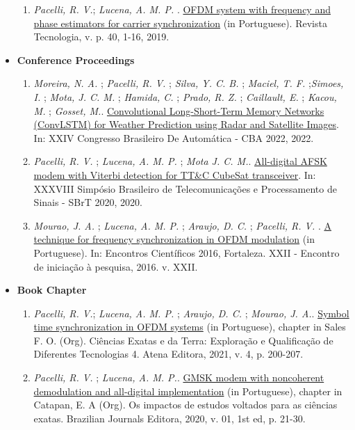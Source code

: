 \begin{itemize}[leftmargin=0.15in, label={}]
\begin{enumerate}[label=\textbf{J\arabic*.}, align=left, leftmargin=1.5cm]
        \item \textit{Pacelli, R. V.}; \textit{Lucena, A. M. P.} . \href{https://periodicos.unifor.br/tec/article/view/7506/5991}{OFDM system with frequency and phase estimators for carrier synchronization} (in Portuguese). Revista Tecnologia, v. p. 40, 1-16, 2019.
    \end{enumerate}
    \item \textbf{Conference Proceedings}
    \begin{enumerate}[label=\textbf{C\arabic*.}, align=left, leftmargin=1.5cm]
        \item \textit{Moreira, N. A.} ; \textit{Pacelli, R. V.} ; \textit{Silva, Y. C. B.} ; \textit{Maciel, T. F.} ;\textit{Simoes, I.} ; \textit{Mota, J. C. M.} ; \textit{Hamida, C.} ; \textit{Prado, R. Z.} ; \textit{Caillault, E.} ; \textit{Kacou, M.} ; \textit{Gosset, M.}. \href{https://www.sba.org.br/cba2022/wp-content/uploads/artigos_cba2022/paper_2351.pdf}{Convolutional Long-Short-Term Memory Networks (ConvLSTM) for Weather Prediction using Radar and Satellite Images}. In: XXIV Congresso Brasileiro De Automática - CBA 2022, 2022.
        \item \textit{Pacelli, R. V.} ; \textit{Lucena, A. M. P.} ; \textit{Mota J. C. M.}. \href{http://www.sbrt.org.br/sbrt2020/papers/1570654898.pdf}{All-digital AFSK modem with Viterbi detection for TT\&C CubeSat transceiver}. In: XXXVIII Simpósio Brasileiro de Telecomunicações e Processamento de Sinais - SBrT 2020, 2020.
        \item \textit{Mourao, J. A.} ; \textit{Lucena, A. M. P.} ; \textit{Araujo, D. C.} ; \textit{Pacelli, R. V.} . \href{https://uol.unifor.br/oul/conteudosite/?cdConteudo=6946081}{A technique for frequency synchronization in OFDM modulation} (in Portuguese). In: Encontros Científicos 2016, Fortaleza. XXII - Encontro de iniciação à pesquisa, 2016. v. XXII.
    \end{enumerate}
    \item \textbf{Book Chapter}
    \begin{enumerate}[label=\textbf{BC\arabic*.}, align=left, leftmargin=1.5cm]
        \item \textit{Pacelli, R. V.}; \textit{Lucena, A. M. P.} ; \textit{Araujo, D. C.} ; \textit{Mourao, J. A.}. \href{https://www.finersistemas.com/atenaeditora/index.php/admin/api/ebookPDF/3771}{Symbol time synchronization in OFDM systems} (in Portuguese), chapter in Sales F. O. (Org). Ciências Exatas e da Terra: Exploração e Qualificação de Diferentes Tecnologias 4. Atena Editora, 2021, v. 4, p. 200-207.
        \item \textit{Pacelli, R. V.} ; \textit{Lucena, A. M. P.}. \href{https://www.brazilianjournals.com.br/assets/ebooks/2c9747ceb79e967166c7d80a9ff8e1da.pdf}{GMSK modem with noncoherent demodulation and all-digital implementation} (in Portuguese), chapter in Catapan, E. A (Org). Os impactos de estudos voltados para as ciências exatas. Brazilian Journals Editora, 2020, v. 01, 1st ed, p. 21-30.
    \end{enumerate}
\end{itemize}